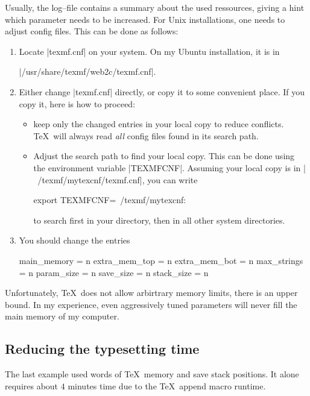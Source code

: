Usually, the log--file contains a summary about the used ressources, giving a hint which parameter needs to be increased. For Unix installations, one needs to adjust config files. This can be done as follows:
\begin{enumerate}
	\item Locate |texmf.cnf| on your system. On my Ubuntu installation, it is in 
	
	|/usr/share/texmf/web2c/texmf.cnf|.
	\item Either change |texmf.cnf| directly, or copy it to some convenient place. If you copy it, here is how to proceed:
		\begin{itemize}
			\item keep only the changed entries in your local copy to reduce conflicts. \TeX\ will always read \emph{all} config files found in its search path.
			\item Adjust the search path to find your local copy. This can be done using the environment variable |TEXMFCNF|. Assuming your local copy is in |~/texmf/mytexcnf/texmf.cnf|, you can write
\begin{codeexample}
export TEXMFCNF=~/texmf/mytexcnf:
\end{codeexample}
			to search first in your directory, then in all other system directories.
		\end{itemize}
	\item You should change the entries
\begin{codeexample}
main_memory = n
extra_mem_top = n
extra_mem_bot = n
max_strings = n
param_size = n
save_size = n
stack_size = n
\end{codeexample}
\end{enumerate}
Unfortunately, \TeX\ does not allow arbirtrary memory limits, there is an upper bound. In my experience, even aggressively tuned parameters will never fill the main memory of my computer.


\subsection{Reducing the typesetting time}
\begin{codeexample}[]
\end{codeexample}
The last example used  words of \TeX\ memory and  save stack positions. It alone requires about $4$ minutes time due to the \TeX\ append macro runtime.

